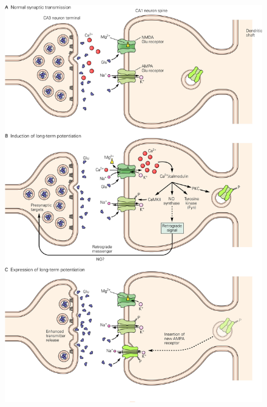 \documentclass[UTF8,nofonts]{ctexart}
\begin{document}
\begin{figure}
	\centering
	\includegraphics[scale=0.9]{Pic/6704_PNS5.jpg}
\end{figure}
\end{document}
